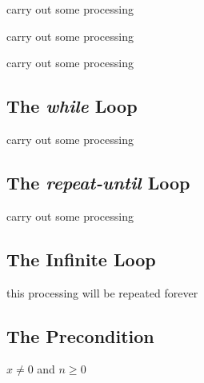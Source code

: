 \documentclass{amsart}
\begin{document}
\begin{algorithmic}[1]
    \STATE carry out some processing 
\ENDFOR
\end{algorithmic}

\begin{algorithmic}[1]
    \STATE carry out some processing 
\ENDFOR
\end{algorithmic}

\begin{algorithmic}[1]
    \STATE carry out some processing 
\ENDFOR
\end{algorithmic}

\subsection{The \emph{while} Loop}

\begin{algorithmic}[1]
    \STATE carry out some processing 
\ENDWHILE
\end{algorithmic}

\subsection{The \emph{repeat-until} Loop}

\begin{algorithmic}[1]
\REPEAT[comment]
    \STATE carry out some processing 
\end{algorithmic}

\subsection{The Infinite Loop}

\begin{algorithmic}[1]
\LOOP[comment]
    \STATE this processing will be repeated forever
\ENDLOOP
\end{algorithmic}

\subsection{The Precondition}

\begin{algorithmic}[1]
\REQUIRE $x \neq 0$ and $n \geq 0$
\end{algorithmic}
\end{document}
